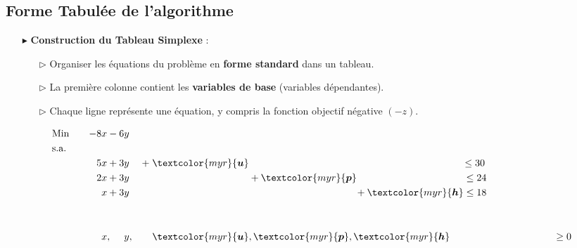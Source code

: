 \documentclass{report}
\begin{document}
\begin{multicols*}{2}
\section{Forme Tabulée de l'algorithme}
\begin{itemize}
    \item[$\blacktriangleright$] \textbf{Construction du Tableau Simplexe} :
    \begin{itemize}
        \item[$\rhd$] Organiser les équations du problème en \textbf{forme standard} dans un tableau.
        \item[$\rhd$] La première colonne contient les \textbf{variables de base} (variables dépendantes).
        \item[$\rhd$] Chaque ligne représente une équation, y compris la fonction objectif négative $(-z)$.
    \end{itemize}
\begin{alignat*}{4}
    &\text{Min} &\quad -8x & - 6y &\\
    &\text{s.a.} \\
    &\phantom{\text{Min}} &\quad 5x & + 3y & 
    + \; \textcolor{myr}{\boldsymbol{u}}& 
    \phantom{+ \; \textcolor{myr}{\boldsymbol{ p}}} 
    \phantom{+ \;\textcolor{myr}{\boldsymbol{ h}}} \leq 30 & 
    \\
    &\phantom{\text{Min}} &\quad 2x & + 3y & 
    \phantom{+\textcolor{myr}{\boldsymbol{ u}}}& + 
    \textcolor{myr}{\boldsymbol{ p}} 
    \phantom{+\;\textcolor{myr}{\boldsymbol{ h}}} 
    \leq 24 & \\
    &\phantom{\text{Min}} &\quad x & + 3y & 
    \phantom{+\textcolor{myr}{\boldsymbol{ u}}}&  
    \phantom{+\;\textcolor{myr}{\boldsymbol{ p}}} 
    +\textcolor{myr}{\boldsymbol{ h}} \leq 18 & \\ 
    \\ 
    \\
                &\phantom{\text{Min}} &\quad x &, \phantom{+3} y,& 
    \textcolor{myr}{\boldsymbol{u}}&,
    \textcolor{myr}{\boldsymbol{ p}}, 
    \textcolor{myr}{\boldsymbol{ h}}
    \phantom{+\textcolor{myr}{\boldsymbol{ p}}} \geq 0 & \\
\end{alignat*}



\end{itemize}
\end{multicols*}
\end{document}
